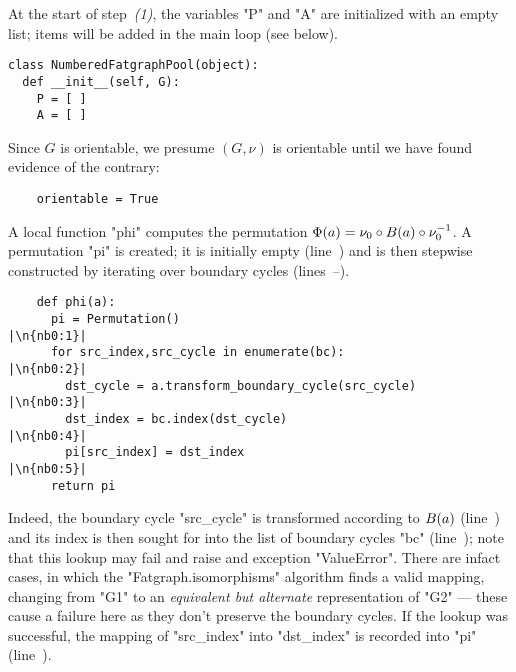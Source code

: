 At the start of step~{\sl (1)}, the variables "P" and "A" are
initialized with an empty list; items will be added in the main loop
(see below).
\begin{lstlisting}
class NumberedFatgraphPool(object):
  def __init__(self, G):
    P = [ ] 
    A = [ ] 

\end{lstlisting}
Since $G$ is orientable, we presume $(G, \nu)$ is orientable until we
have found evidence of the contrary:
\begin{lstlisting}
    orientable = True

\end{lstlisting}

A local function "phi" computes the permutation $\Phi(a) = \nu_0 \circ
B(a) \circ \nu_0^{-1}$.  A permutation "pi" is created; it is
initially empty (line~) and is then stepwise constructed by
iterating over boundary cycles (lines~--).  
\begin{lstlisting}
    def phi(a):
      pi = Permutation()                                     |\n{nb0:1}|
      for src_index,src_cycle in enumerate(bc):              |\n{nb0:2}|
        dst_cycle = a.transform_boundary_cycle(src_cycle)    |\n{nb0:3}|
        dst_index = bc.index(dst_cycle)                      |\n{nb0:4}|
        pi[src_index] = dst_index                            |\n{nb0:5}|
      return pi

\end{lstlisting}
Indeed, the boundary cycle "src_cycle" is transformed according to
$B(a)$ (line~) and its index is then sought for into
the list of boundary cycles "bc" (line~); note that this
lookup may fail and raise and exception "ValueError".  There are
infact cases, in which the "Fatgraph.isomorphisms" algorithm finds a
valid mapping, changing from "G1" to an \emph{equivalent but
  alternate} representation of "G2" --- these cause a failure here as
they don't preserve the boundary cycles.
If the lookup was successful, the mapping of "src_index" into
"dst_index" is recorded into "pi" (line~).


